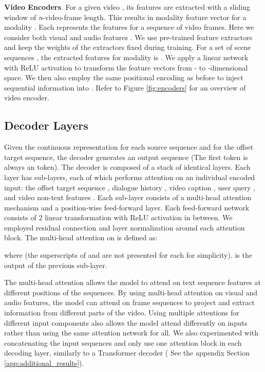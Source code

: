 \documentclass[11pt,a4paper]{article}
\begin{document}
\textbf{Video Encoders}. For a given video , its features are extracted with a sliding window of \textit{n}-video-frame length. This results in modality feature vector  for a modality . Each  represents the features for a sequence of  video frames. Here we consider both visual and audio features . We use pre-trained feature extractors and keep the weights of the extractors fixed during training. For a set of scene sequences , the extracted features for modality  is . 
We apply a linear network with ReLU activation to transform the feature vectors from - to -dimensional space. We then also employ the same positional encoding as before to inject sequential information into . Refer to Figure \ref{fig:encoders} for an overview of video encoder.

\subsection{Decoder Layers}
Given the continuous representation  for each source sequence  and  for the offset target sequence, the decoder generates an output sequence  (The first token is always an  token). The decoder is composed of a stack of  identical layers. Each layer has  sub-layers, each of which performs attention on an individual encoded input: the offset target sequence , dialogue history , video caption , user query , and video non-text features . Each sub-layer consists of a multi-head attention mechanism and a position-wise feed-forward layer. Each feed-forward network consists of 2 linear transformation with ReLU activation in between. We employed residual connection \cite{he2016deep} and layer normalization \cite{ba2016layer} around each attention block. The multi-head attention on  is defined as: 

where  (the superscripts of  and  are not presented for each  for simplicity).  is the output of the previous sub-layer. 


The multi-head attention allows the model to attend on text sequence features at different positions of the sequences. 
By using multi-head attention on visual and audio features, the model can attend on frame sequences to project and extract information from different parts of the video. Using multiple attentions for different input components also allows the model attend differently on inputs rather than using the same attention network for all. We also experimented with concatenating the input sequences and only use one attention block in each decoding layer, similarly to a Transformer decoder ( See the appendix Section \ref{app:additional_results}). 
\end{document}
